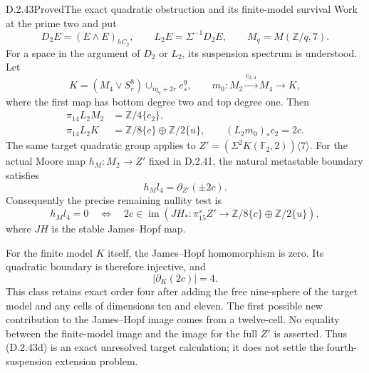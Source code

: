 \begin{claim}{D.2.43}{Proved}{The exact quadratic obstruction and its finite-model survival}
Work at the prime two and put
\[
 D_2E=(E\wedge E)_{hC_2},\qquad L_2E=\Sigma^{-1}D_2E,
 \qquad M_q=M(\mathbb Z/q,7).
\]
For a space in the argument of $D_2$ or $L_2$, its suspension
spectrum is understood. Let
\[
 K=(M_4\vee S^8_r)\cup_{i\eta_7+2r}e^9_s,
 \qquad m_0:M_2\xrightarrow{c_{2,4}}M_4\longrightarrow K,
 \tag{D.2.43a}
\]
where the first map has bottom degree two and top degree one.
Then
\[
 \begin{split}
  \pi_{14}L_2M_2&=\mathbb Z/4\{c_2\},\\
  \pi_{14}L_2K&=\mathbb Z/8\{c\}\oplus\mathbb Z/2\{u\},
  \qquad (L_2m_0)_*c_2=2c.
 \end{split}
 \tag{D.2.43b}
\]
The same target quadratic group applies to
$Z'=(\Sigma^2K(\mathbb F_2,2))\langle7\rangle$.
For the actual Moore map $h_M:M_2\to Z'$ fixed in D.2.41,
the natural metastable boundary satisfies
\[
 h_Ml_4=\partial_{Z'}(\pm2c).
 \tag{D.2.43c}
\]
Consequently the precise remaining nullity test is
\[
 h_Ml_4=0
 \quad\Longleftrightarrow\quad
 2c\in\operatorname{im}\left(
  JH_*:\pi_{15}^{s}Z'\longrightarrow
       \mathbb Z/8\{c\}\oplus\mathbb Z/2\{u\}
 \right),
 \tag{D.2.43d}
\]
where $JH$ is the stable James--Hopf map.

For the finite model $K$ itself, the James--Hopf homomorphism
is zero. Its quadratic boundary is therefore injective, and
\[
 |\partial_K(2c)|=4.
 \tag{D.2.43e}
\]
This class retains exact order four after adding the free
nine-sphere of the target model and any cells of dimensions
ten and eleven. The first possible new contribution to the
James--Hopf image comes from a twelve-cell.
No equality between the finite-model image and the image for
the full $Z'$ is asserted. Thus
\textup{(D.2.43d)} is an exact unresolved target calculation;
it does not settle the fourth-suspension extension problem.
\end{claim}

